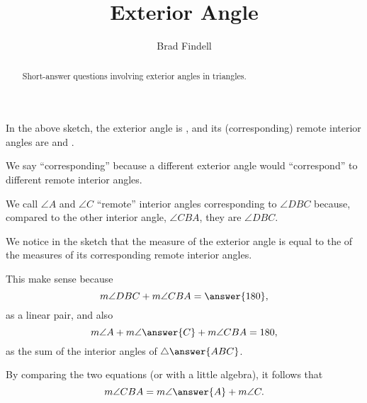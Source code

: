 \documentclass[nooutcomes]{ximera}
\title{Exterior Angle}
\author{Brad Findell}
\begin{document}
\begin{abstract}
Short-answer questions involving exterior angles in triangles. 
\end{abstract}
\maketitle

\begin{center}  
\end{center}

\begin{problem}
In the above sketch, the exterior angle is 
, and its (corresponding) remote interior angles are  and . 

\begin{feedback}[correct]
We say ``corresponding'' because a different exterior angle would ``correspond'' to different remote interior angles.
\end{feedback}
\begin{problem}
We call $\angle A$ and $\angle C$ ``remote'' interior angles corresponding to $\angle DBC$ because, compared to the other interior angle, $\angle CBA$, they are 
 $\angle DBC$.
\end{problem}
\end{problem}

\begin{problem}
We notice in the sketch that the measure of the exterior angle is equal to the 
 of the measures of its corresponding remote interior angles.  

This make sense because 
\[
m\angle DBC + m\angle CBA = \answer{180},
\]
as a linear pair, and also 
\[
m\angle A + m\angle \answer{C} + m\angle CBA = 180, 
\]
as the sum of the interior angles of $\triangle \answer{ABC}$.  

By comparing the two equations (or with a little algebra), it follows that 
\[
m\angle CBA = m\angle \answer{A} + m\angle C.
\]
\end{problem}
\end{document}
